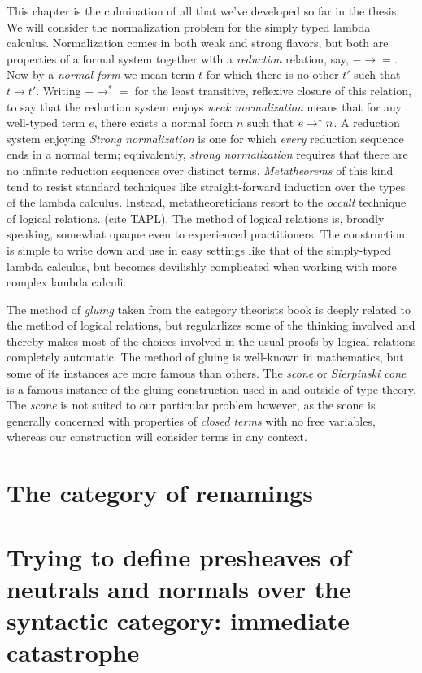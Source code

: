 \documentclass[12pt,twoside]{reedthesis}
\theoremstyle{definition}
\theoremstyle{remark}
\theoremstyle{plain}
\begin{document}
This chapter is the culmination of all that we've developed so far in the
thesis. We will consider the normalization problem for the simply typed lambda
calculus. Normalization comes in both weak and strong flavors, but both are
properties of a formal system together with a \emph{reduction} relation, say,
\( - \rightarrow = \). Now by a \emph{normal form} we mean term $t$ for which there is no
other $t'$ such that \( t \rightarrow t' \). Writing \( - \rightarrow^{*} = \) for the least
transitive, reflexive closure of this relation, to say that the reduction system
enjoys \emph{weak normalization} means that for any well-typed term \( e \),
there exists a normal form \( n \) such that \( e \rightarrow^{*} n\). A reduction system
enjoying \emph{Strong normalization} is one for which \emph{every} reduction
sequence ends in a normal term; equivalently, \emph{strong normalization}
requires that there are no infinite reduction sequences over distinct terms.
\emph{Metatheorems} of this kind tend to resist standard techniques like
straight-forward induction over the types of the lambda calculus. Instead,
metatheoreticians resort to the \emph{occult} technique of logical relations.
(cite TAPL). The method of logical relations is, broadly speaking, somewhat
opaque even to experienced practitioners. The construction is simple to write
down and use in easy settings like that of the simply-typed lambda calculus, but
becomes devilishly complicated when working with more complex lambda calculi.

The method of \emph{gluing} taken from the category theorists book is deeply
related to the method of logical relations, but regularlizes some of the
thinking involved and thereby makes most of the choices involved in the usual
proofs by logical relations completely automatic. The method of gluing is
well-known in mathematics, but some of its instances are more famous than
others. The \emph{scone} or \emph{Sierpinski cone} is a famous instance of the
gluing construction used in and outside of type theory. The \emph{scone} is not
suited to our particular problem however, as the scone is generally concerned
with properties of \emph{closed terms} with no free variables, whereas our
construction will consider terms in any context.

\section{The category of renamings}

\section{Trying to define presheaves of neutrals and normals over the syntactic
  category: immediate catastrophe}
\end{document}
